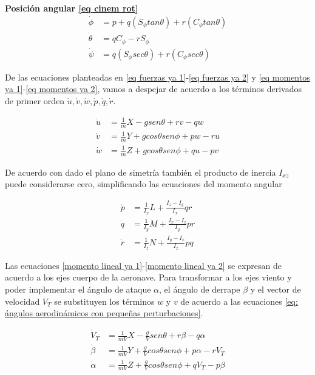 \textbf{Posición angular \ref{eq cinem rot}}
\begin{align}
\label{posi angular 1}
    \dot \phi &= p + q (S_{\phi} tan\theta) + r (C_{\phi} tan\theta)\\
    \dot \theta &=  qC_{\phi} - r S_{\phi}\\
    \dot \psi &= q (S_{\phi} sec\theta) + r (C_{\phi} sec\theta)
\label{posi angular 2}
\end{align}

De las ecuaciones planteadas en \ref{eq fuerzas ya 1}-\ref{eq fuerzas ya 2} y  \ref{eq momentos ya 1}-\ref{eq momentos ya 2}, vamos a despejar de acuerdo a los términos derivados de primer orden $\dot u, \dot v, \dot w, \dot p, \dot q, \dot r$.


\begin{align}
\label{momento lineal ya 1}
    \dot u &= \frac{1}{m}X - gsen\theta + rv - qw \\
    \dot v &= \frac{1}{m}Y + gcos\theta sen\phi + pw - ru \\
    \dot w &= \frac{1}{m}Z + gcos\theta sen\phi + qu - pv
\label{momento lineal ya 2}
\end{align}

De acuerdo con \cite{Mohammad2020} dado el plano de simetría también el producto de inercia $I_{xz}$ puede considerarse cero, simplificando las ecuaciones del momento angular

\begin{align}
\label{moment angu 1 ya}
    \dot p &= \frac{1}{I_x}L + \frac{I_z - I_y}{I_x}qr \\
    \dot q &= \frac{1}{I_y}M  + \frac{I_x - I_z}{I_y}pr \\
    \dot r &= \frac{1}{I_z}N   + \frac{I_y - I_x}{I_z}pq
\label{moment angu 2 ya}
\end{align}

Las ecuaciones \ref{momento lineal ya 1}-\ref{momento lineal ya 2} se expresan de acuerdo a los ejes cuerpo de la aeronave. Para transformar a los ejes viento y poder implementar el ángulo de ataque $\alpha$, el ángulo de derrape $\beta$ y el vector de velocidad $V_T$ se substituyen los términos $w$ y $v$ de acuerdo a las ecuaciones \ref{eq: ángulos aerodinámicos con pequeñas perturbaciones}. 

\begin{align}    
\label{aero 1 ya}
    \dot V_T &= \frac{1}{mV}X - \frac{g}{V} sen\theta + r\beta - q\alpha \\
    \dot \beta &= \frac{1}{mV}Y + \frac{g}{V} cos\theta sen\phi + p\alpha - r V_T \\
    \dot \alpha &= \frac{1}{mV}Z + \frac{g}{V} cos\theta sen\phi + q V_T - p\beta
\label{aero 2 ya}
\end{align}

